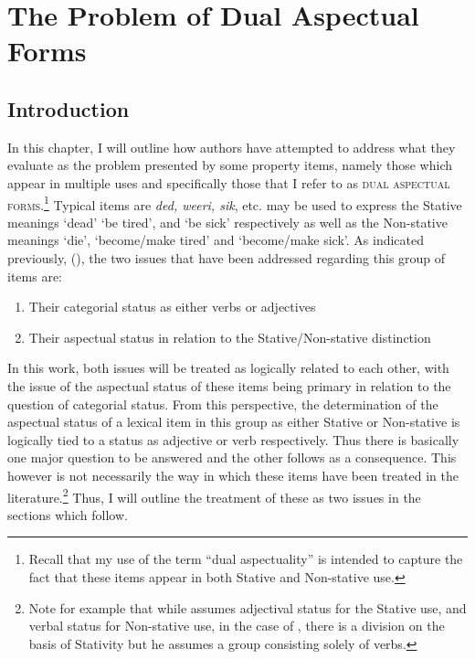 \chapter{The Problem of Dual Aspectual Forms}\label{ch:3}\label{sec:3}


\section{Introduction}\label{sec:3.0}

In this chapter, I will outline how authors have attempted to address
what they evaluate as the problem presented by some property items,
namely those which appear in multiple uses and specifically those that
I refer to as \textsc{dual aspectual forms}.\footnote{Recall that my use of the
  term ``dual aspectuality'' is intended to capture the fact that these
  items appear in both Stative and Non-stative use.}  Typical items
are \textit{ded, weeri, sik}, etc. may be used to express the Stative
meanings `dead’ `be tired', and `be sick' respectively as well as the
Non-stative meanings `die',  `become\slash make tired' and `become\slash make
sick'.  As indicated previously, (), the two issues
that have been addressed regarding this group of items are:

\begin{enumerate}
\item Their categorial status as either verbs or adjectives
\item Their aspectual status in relation to the Stative\slash Non-stative
  distinction
\end{enumerate}

In this work, both issues will be treated as logically related to each
other, with the issue of the aspectual status of these items being
primary in relation to the question of categorial status.  From this
perspective, the determination of the aspectual status of a lexical
item in this group as either Stative or Non-stative is logically tied
to a status as adjective or verb respectively.  Thus there is
basically one major question to be answered and the other follows as
a consequence.  This however is not necessarily the way in which these
items have been treated in the literature.\footnote{Note for example
  that while \citet{Kouwenberg1996} assumes adjectival status for the
  Stative use, and verbal status for Non-stative use, in the case of
  \citet{Winford1993}, there is a division on the basis of Stativity
  but he assumes a group consisting solely of verbs.} Thus, I will
outline the treatment of these as two issues in the sections which
follow.

